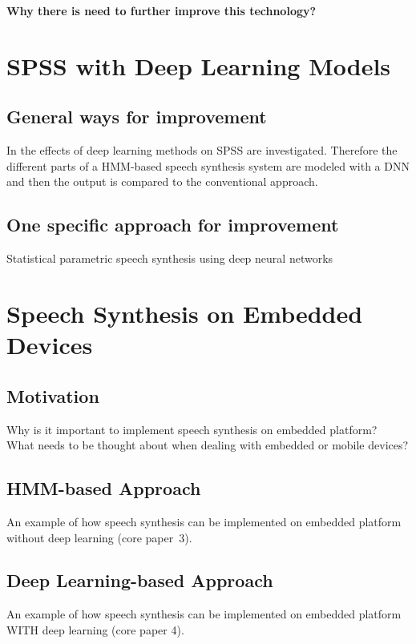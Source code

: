 \vspace{1em}
\textbf{Why there is need to further improve this technology?}

\clearpage

\section{\ac{SPSS} with Deep Learning Models}
\label{sec:deepspeech}

\subsection{General ways for improvement}
\label{subsec:deepeffect}

In \cite{hashimoto:effect} the effects of deep learning methods on \ac{SPSS} are investigated. Therefore the different parts of a \ac{HMM}-based speech synthesis system are modeled with a \ac{DNN} and then the output is compared to the conventional approach.

\subsection{One specific approach for improvement}
\label{subsec:deepspss}

Statistical parametric speech synthesis using deep neural networks \cite{zen:deepstatistical}

\section{Speech Synthesis on Embedded Devices}
\label{sec:embeddedspeech}

\subsection{Motivation}
\label{subsec:motembedded}

Why is it important to implement speech synthesis on embedded platform?\\
What needs to be thought about when dealing with embedded or mobile devices?

\subsection{\ac{HMM}-based Approach}
\label{subsec:hmmembedded}

An example of how speech synthesis can be implemented on embedded platform without deep learning (core paper~3).

\subsection{Deep Learning-based Approach}
\label{subsec:deepembedded}

An example of how speech synthesis can be implemented on embedded platform WITH deep learning (core paper 4).

\clearpage
